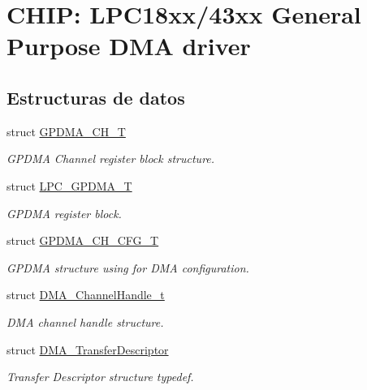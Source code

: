 \hypertarget{group___g_p_d_m_a__18_x_x__43_x_x}{}\section{C\+H\+IP\+: L\+P\+C18xx/43xx General Purpose D\+MA driver}
\label{group___g_p_d_m_a__18_x_x__43_x_x}
\subsection*{Estructuras de datos}
\begin{DoxyCompactItemize}
\item 
struct \hyperlink{struct_g_p_d_m_a___c_h___t}{G\+P\+D\+M\+A\+\_\+\+C\+H\+\_\+T}
\begin{DoxyCompactList}\small\item\em G\+P\+D\+MA Channel register block structure. \end{DoxyCompactList}\item 
struct \hyperlink{struct_l_p_c___g_p_d_m_a___t}{L\+P\+C\+\_\+\+G\+P\+D\+M\+A\+\_\+T}
\begin{DoxyCompactList}\small\item\em G\+P\+D\+MA register block. \end{DoxyCompactList}\item 
struct \hyperlink{struct_g_p_d_m_a___c_h___c_f_g___t}{G\+P\+D\+M\+A\+\_\+\+C\+H\+\_\+\+C\+F\+G\+\_\+T}
\begin{DoxyCompactList}\small\item\em G\+P\+D\+MA structure using for D\+MA configuration. \end{DoxyCompactList}\item 
struct \hyperlink{struct_d_m_a___channel_handle__t}{D\+M\+A\+\_\+\+Channel\+Handle\+\_\+t}
\begin{DoxyCompactList}\small\item\em D\+MA channel handle structure. \end{DoxyCompactList}\item 
struct \hyperlink{struct_d_m_a___transfer_descriptor}{D\+M\+A\+\_\+\+Transfer\+Descriptor}
\begin{DoxyCompactList}\small\item\em Transfer Descriptor structure typedef. \end{DoxyCompactList}\end{DoxyCompactItemize}
